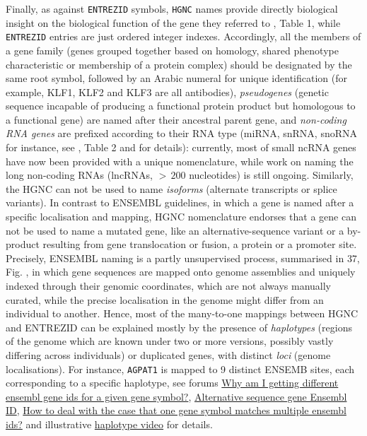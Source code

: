 Finally, as against \texttt{ENTREZID} symbols, \texttt{HGNC} names provide directly biological insight on the biological function of the gene they referred to \autocite{bruford_etal20}, Table 1, while \texttt{ENTREZID} entries are just ordered integer indexes. Accordingly, all the members of a gene family (genes grouped together based on homology, shared phenotype characteristic or membership of a protein complex) should be designated by the same root symbol, followed by an Arabic numeral for unique identification (for example, KLF1, KLF2 and KLF3 are all antibodies), \emph{pseudogenes} (genetic sequence incapable of producing a functional protein product but homologous to a functional gene) are named after their ancestral parent gene, and \emph{non-coding RNA genes} are prefixed according to their RNA type (miRNA, snRNA, snoRNA for instance, see \autocite{bruford_etal20}, Table 2 and \autocite{wright_bruford11} for details): currently, most of small ncRNA genes have now been provided with a unique nomenclature, while work on naming the long non-coding RNAs (lncRNAs, \(> \, 200\) nucleotides) is still ongoing. Similarly, the HGNC can not be used to name \emph{isoforms} (alternate transcripts or splice variants).
In contrast to ENSEMBL guidelines, in which a gene is named after a specific localisation and mapping, HGNC nomenclature endorses that a gene can not be used to name a mutated gene, like an alternative-sequence variant or a by-product resulting from gene translocation or fusion, a protein or a promoter site. Precisely, ENSEMBL naming \autocite{birney_etal04} is a partly unsupervised process, summarised in \autocite{aken_etal16}37, Fig. , in which gene sequences are mapped onto genome assemblies and uniquely indexed through their genomic coordinates, which are not always manually curated, while the precise localisation in the genome might differ from an individual to another. Hence, most of the many-to-one mappings between HGNC and ENTREZID can be explained mostly by the presence of \emph{haplotypes} (regions of the genome which are known under two or more versions, possibly vastly differing across individuals) or duplicated genes, with distinct \emph{loci} (genome localisations). For instance, \texttt{AGPAT1} is mapped to 9 distinct ENSEMB sites, each corresponding to a specific haplotype, see forums \href{https://www.biostars.org/p/119540/\#119767}{Why am I getting different ensembl gene ids for a given gene symbol?}, \href{https://www.biostars.org/p/169596/\#169623}{Alternative sequence gene Ensembl ID}, \href{https://www.biostars.org/p/352492/}{How to deal with the case that one gene symbol matches multiple ensembl ids?} and illustrative \href{https://www.youtube.com/watch?v=sPE9j_Hw9HU}{haplotype video} for details.

